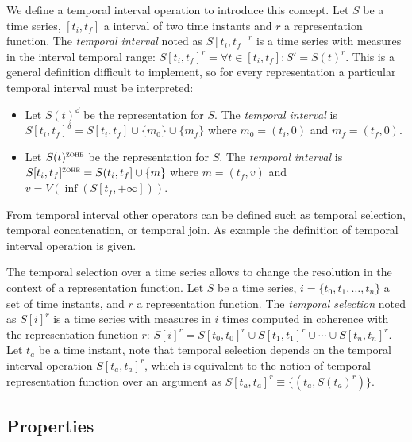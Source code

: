 

We define a temporal interval operation to introduce this
concept.
Let $S$ be a time series, $[t_i,t_f]$ a interval of two time instants
and $r$ a representation function. The \emph{temporal interval} noted
as $S[t_i,t_f]^r$ is a time series with measures in the interval
temporal range: $S[t_i,t_f]^r= \forall t \in [t_i,t_f] : S' = S(t)^r
$. This is a general definition difficult to implement, so for every
representation a particular temporal interval must be interpreted:

\begin{itemize}
\item Let $S(t)^\dd$ be the \dd{} representation for $S$. The
  \emph{\dd{} temporal interval} is $S[t_i,t_f]^\delta = S[t_i,t_f]
  \cup \{m_0\} \cup \{m_f\}$ where $m_0=(t_i,0)$ and $m_f=(t_f,0)$.

\item Let $S(t)^\zohe{}$ be the \zohe{} representation for $S$. The
  \emph{\zohe{} temporal interval} is $S[t_i,t_f]^\zohe{} = S(t_i,t_f]
  \cup \{m\}$ where $m=(t_f,v)$ and $v= V(\inf( S[t_f,+\infty] ))$.
\end{itemize}



From temporal interval other operators can be defined such as temporal
selection, temporal concatenation, or temporal join. As example the
definition of temporal interval operation is given.


The temporal selection over a time series allows to change the
resolution in the context of a representation function.  Let $S$ be a
time series, $i=\{t_0,t_1,\dotsc,t_n\}$ a set of time instants, and
$r$ a representation function. The \emph{temporal selection} noted as
$S[i]^r$ is a time series with measures in $i$ times computed in
coherence with the representation function $r$: $S[i]^r = S[t_0,t_0]^r
\cup S[t_1,t_1]^r \cup \dotsb \cup S[t_n,t_n]^r$. Let $t_a$ be a time
instant, note that temporal selection depends on the temporal interval
operation $S[t_a,t_a]^r$, which is equivalent to the notion of
temporal representation function over an argument as $S[t_a,t_a]^r
\equiv \{ (t_a, S(t_a)^r) \}$.





\subsection{Properties}
\label{sec:model:properties} 

